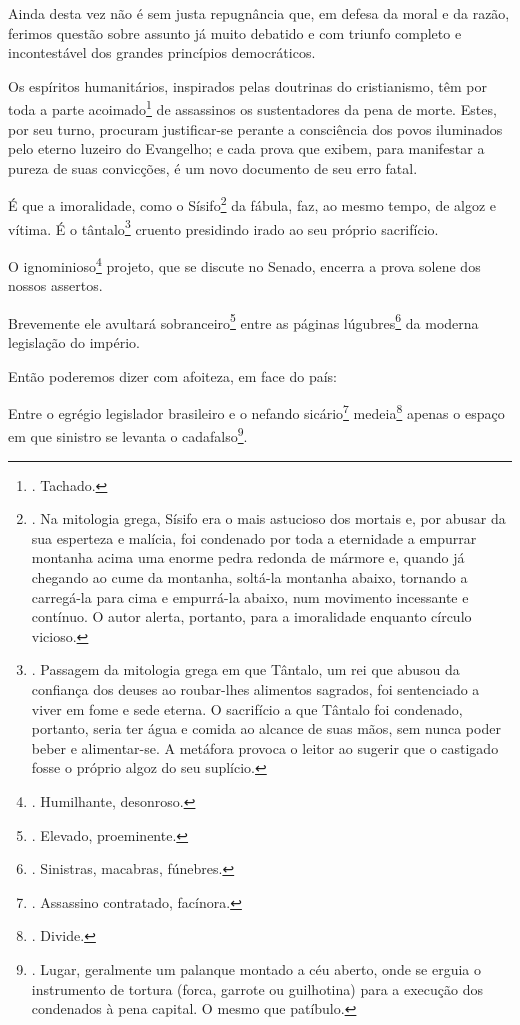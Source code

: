Ainda desta vez não é sem justa repugnância que, em defesa da moral e da
razão, ferimos questão sobre assunto já muito debatido e com triunfo
completo e incontestável dos grandes princípios democráticos.

Os espíritos humanitários, inspirados pelas doutrinas do cristianismo,
têm por toda a parte acoimado\footnote{. Tachado.} de assassinos os
sustentadores da pena de morte. Estes, por seu turno, procuram
justificar-se perante a consciência dos povos iluminados pelo eterno
luzeiro do Evangelho; e cada prova que exibem, para manifestar a pureza
de suas convicções, é um novo documento de seu erro fatal.

É que a imoralidade, como o Sísifo\footnote{. Na mitologia grega, Sísifo
  era o mais astucioso dos mortais e, por abusar da sua esperteza e
  malícia, foi condenado por toda a eternidade a empurrar montanha acima
  uma enorme pedra redonda de mármore e, quando já chegando ao cume da
  montanha, soltá-la montanha abaixo, tornando a carregá-la para cima e
  empurrá-la abaixo, num movimento incessante e contínuo. O autor
  alerta, portanto, para a imoralidade enquanto círculo vicioso.} da
fábula, faz, ao mesmo tempo, de algoz e vítima. É o tântalo\footnote{.
  Passagem da mitologia grega em que Tântalo, um rei que abusou da
  confiança dos deuses ao roubar-lhes alimentos sagrados, foi
  sentenciado a viver em fome e sede eterna. O sacrifício a que Tântalo
  foi condenado, portanto, seria ter água e comida ao alcance de suas
  mãos, sem nunca poder beber e alimentar-se. A metáfora provoca o
  leitor ao sugerir que o castigado fosse o próprio algoz do seu
  suplício.} cruento presidindo irado ao seu próprio sacrifício.

O ignominioso\footnote{. Humilhante, desonroso.} projeto, que se discute
no Senado, encerra a prova solene dos nossos assertos.

Brevemente ele avultará sobranceiro\footnote{. Elevado, proeminente.}
entre as páginas lúgubres\footnote{. Sinistras, macabras, fúnebres.} da
moderna legislação do império.

Então poderemos dizer com afoiteza, em face do país:

Entre o egrégio legislador brasileiro e o nefando sicário\footnote{.
  Assassino contratado, facínora.} medeia\footnote{. Divide.} apenas o
espaço em que sinistro se levanta o cadafalso\footnote{. Lugar,
  geralmente um palanque montado a céu aberto, onde se erguia o
  instrumento de tortura (forca, garrote ou guilhotina) para a execução
  dos condenados à pena capital. O mesmo que patíbulo.}.

